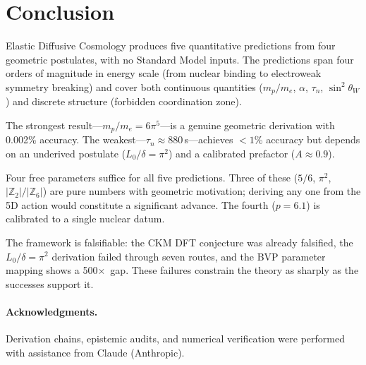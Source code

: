 \documentclass[12pt,a4paper]{article}
\theoremstyle{definition}
\theoremstyle{remark}
\newcommand{\stw}{\sin^2\!\theta_W}
\newcommand{\Zn}[1]{\mathbb{Z}_{#1}}
\begin{document}
\section{Conclusion}
\label{sec:conclusion}

Elastic Diffusive Cosmology produces five quantitative predictions
from four geometric postulates, with no Standard Model inputs.
The predictions span four orders of magnitude in energy scale
(from nuclear binding to electroweak symmetry breaking) and cover
both continuous quantities ($m_p/m_e$, $\alpha$, $\tau_n$, $\stw$)
and discrete structure (forbidden coordination zone).

The strongest result---$m_p/m_e = 6\pi^5$---is a genuine geometric
derivation with 0.002\% accuracy.  The weakest---$\tau_n \approx
880$\,s---achieves $<1$\% accuracy but depends on an underived
postulate ($L_0/\delta = \pi^2$) and a calibrated prefactor
($A \approx 0.9$).

Four free parameters suffice for all five predictions.  Three of
these ($5/6$, $\pi^2$, $|\Zn{2}|/|\Zn{6}|$) are pure numbers with
geometric motivation; deriving any one from the 5D action would
constitute a significant advance.  The fourth ($p = 6.1$) is
calibrated to a single nuclear datum.

The framework is falsifiable: the CKM DFT conjecture was already
falsified, the $L_0/\delta = \pi^2$ derivation failed through seven
routes, and the BVP parameter mapping shows a 500$\times$~gap.
These failures constrain the theory as sharply as the successes
support it.

\paragraph{Acknowledgments.}
Derivation chains, epistemic audits, and numerical verification were
performed with assistance from Claude (Anthropic).
\end{document}
